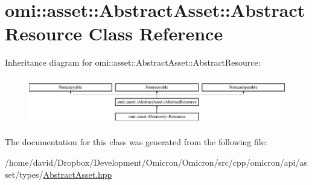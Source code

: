\hypertarget{classomi_1_1asset_1_1_abstract_asset_1_1_abstract_resource}{}\section{omi\+:\+:asset\+:\+:Abstract\+Asset\+:\+:Abstract\+Resource Class Reference}
\label{classomi_1_1asset_1_1_abstract_asset_1_1_abstract_resource}
Inheritance diagram for omi\+:\+:asset\+:\+:Abstract\+Asset\+:\+:Abstract\+Resource\+:\begin{figure}[H]
\begin{center}
\leavevmode
\includegraphics[height=2.113208cm]{classomi_1_1asset_1_1_abstract_asset_1_1_abstract_resource}
\end{center}
\end{figure}


The documentation for this class was generated from the following file\+:\begin{DoxyCompactItemize}
\item 
/home/david/\+Dropbox/\+Development/\+Omicron/\+Omicron/src/cpp/omicron/api/asset/types/\hyperlink{_abstract_asset_8hpp}{Abstract\+Asset.\+hpp}\end{DoxyCompactItemize}
